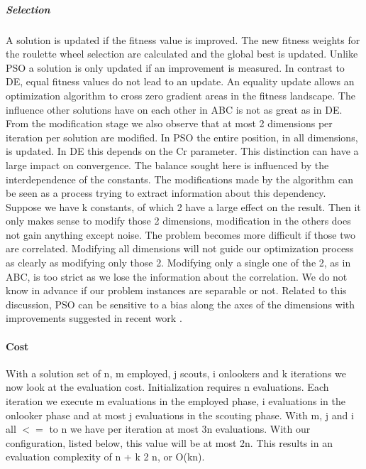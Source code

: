 \subparagraph{Selection}
A solution is updated if the fitness value is improved. The new fitness weights for the roulette wheel selection are calculated and the global best is updated. Unlike PSO a solution is only updated if an improvement is measured. In contrast to DE, equal fitness values do not lead to an update. An equality update allows an optimization algorithm to cross zero gradient areas in the fitness landscape. The influence other solutions have on each other in ABC is not as great as in DE. From the modification stage we also observe that at most 2 dimensions per iteration per solution are modified. In PSO the entire position, in all dimensions, is updated. In DE this depends on the Cr parameter. This distinction can have a large impact on convergence. The balance sought here is influenced by the interdependence of the constants. The modifications made by the algorithm can be seen as a process trying to extract information about this dependency. Suppose we have k constants, of which 2 have a large effect on the result. Then it only makes sense to modify those 2 dimensions, modification in the others does not gain anything except noise. The problem becomes more difficult if those two are correlated. Modifying all dimensions will not guide our optimization process as clearly as modifying only those 2. Modifying only a single one of the 2, as in ABC, is too strict as we lose the information about the correlation.
We do not know in advance if our problem instances are separable or not. Related to this discussion, PSO can be sensitive to a bias along the axes of the dimensions \cite{PSOBias} with improvements suggested in recent work \cite{PSOBiasAlg}.


\paragraph{Cost}\label{abccost}
With a solution set of n, m employed, j scouts, i onlookers and k iterations we now look at the evaluation cost.
Initialization requires n evaluations. Each iteration we execute m evaluations in the employed phase, i evaluations in the onlooker phase and at most j evaluations in the scouting phase. With m, j and i all $<=$ to n we have per iteration at most 3n evaluations. With our configuration, listed below, this value will be at most 2n. This results in an evaluation complexity of n + k 2 n, or O(kn).

